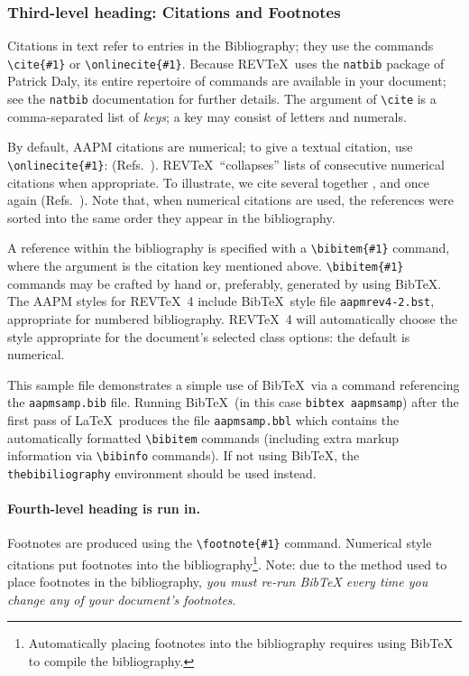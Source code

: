\documentclass[%
 aapm,
 mph,%
 amsmath,amssymb,
preprint,%
 reprint,%
]{revtex4-2}
\begin{document}
\subsubsection{\label{sec:level3}Third-level heading: Citations and Footnotes}

Citations in text refer to entries in the Bibliography;
they use the commands \verb+\cite{#1}+ or \verb+\onlinecite{#1}+.
Because REV\TeX\ uses the \verb+natbib+ package of Patrick Daly,
its entire repertoire of commands are available in your document;
see the \verb+natbib+ documentation for further details.
The argument of \verb+\cite+ is a comma-separated list of \emph{keys};
a key may consist of letters and numerals.

By default, AAPM citations are numerical; \cite{feyn54}
to give a textual citation, use \verb+\onlinecite{#1}+: (Refs.~).
REV\TeX\ ``collapses'' lists of consecutive numerical citations when appropriate.
To illustrate, we cite several together \cite{feyn54,witten2001,epr,Berman1983},
and once again (Refs.~).
Note that, when numerical citations are used, the references were sorted into the same order they appear in the bibliography.

A reference within the bibliography is specified with a \verb+\bibitem{#1}+ command,
where the argument is the citation key mentioned above.
\verb+\bibitem{#1}+ commands may be crafted by hand or, preferably,
generated by using Bib\TeX.
The AAPM styles for REV\TeX~4 include Bib\TeX\ style file
\verb+aapmrev4-2.bst+, appropriate for
numbered bibliography.
REV\TeX~4 will automatically choose the style appropriate for
the document's selected class options: the default is numerical.

This sample file demonstrates a simple use of Bib\TeX\
via a \verb++ command referencing the \verb+aapmsamp.bib+ file.
Running Bib\TeX\ (in this case \texttt{bibtex
  aapmsamp}) after the first pass of \LaTeX\ produces the file
\verb+aapmsamp.bbl+ which contains the automatically formatted
\verb+\bibitem+ commands (including extra markup information via
\verb+\bibinfo+ commands). If not using Bib\TeX, the
\verb+thebibiliography+ environment should be used instead.

\paragraph{Fourth-level heading is run in.}%
Footnotes are produced using the \verb+\footnote{#1}+ command.
Numerical style citations put footnotes into the
bibliography\footnote{Automatically placing footnotes into the bibliography requires using BibTeX to compile the bibliography.}.
Note: due to the method used to place footnotes in the bibliography, \emph{you
  must re-run BibTeX every time you change any of your document's
  footnotes}.
\end{document}
